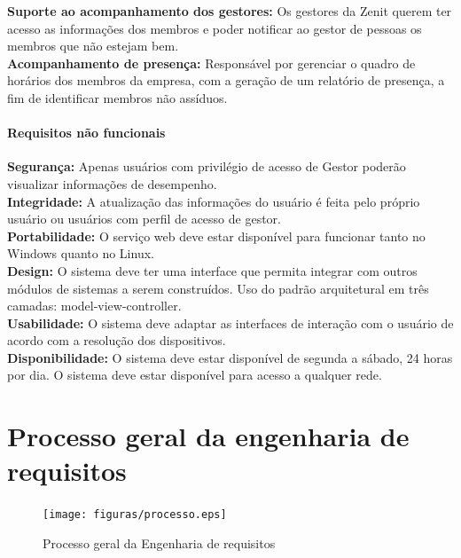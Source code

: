 \begin{anexosenv}
\textbf{Suporte ao acompanhamento dos gestores:} Os gestores da Zenit querem ter acesso as informações dos membros e poder notificar ao gestor de pessoas os membros que não estejam bem.\\

\textbf{Acompanhamento de presença:} Responsável por gerenciar o quadro de horários dos membros da empresa, com a geração de um relatório de presença, a fim de identificar membros não assíduos.\\

\subsubsection[Requisitos não funcionais]{Requisitos não funcionais}

\textbf{Segurança:} Apenas usuários com privilégio de acesso de Gestor poderão visualizar informações de desempenho.\\

\textbf{Integridade:} A atualização das informações do usuário é feita pelo próprio usuário ou usuários com perfil de acesso de gestor.\\

\textbf{Portabilidade:} O serviço web deve estar disponível para funcionar tanto no Windows quanto no Linux.\\

\textbf{Design:} O sistema deve ter uma interface que permita integrar com outros módulos de sistemas a serem construídos. Uso do padrão arquitetural em três camadas: model-view-controller.\\

\textbf{Usabilidade:} O sistema deve adaptar as interfaces de interação com o usuário de acordo com a resolução dos dispositivos.\\

\textbf{Disponibilidade:} O sistema deve estar disponível de segunda a sábado, 24 horas por dia. O sistema deve estar disponível para acesso a qualquer rede.\\

\chapter[Processo geral]{Processo geral da engenharia de requisitos}

\begin{figure}
    \centering
    \texttt{[image: figuras/processo.eps]}
    \caption[Processo geral]{Processo geral da Engenharia de requisitos}
\end{figure}


\end{anexosenv}
